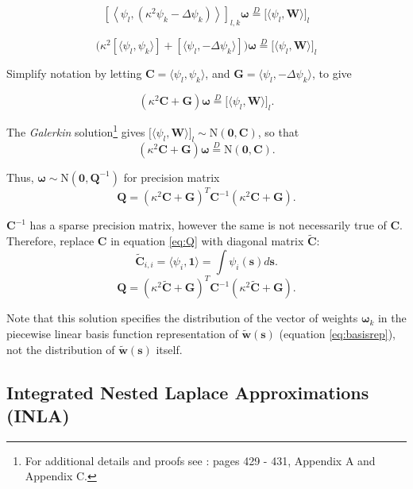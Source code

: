 $$  \left[ \left< \psi_{l}, (\kappa^{2}\psi_{k} - \Delta \psi_{k})  \right> \right]_{l,k} \pmb{\omega} 
\overset{D}{=} 
\Big[ \langle \psi_{l}, \pmb{W} \rangle \Big]_{l}  $$

$$ \Big( \kappa^{2} [ \langle \psi_{l}, \psi_{k} \rangle ] + [ \langle \psi_{l}, -\Delta \psi_{k} \rangle ] \Big) \pmb{\omega} 
\overset{D}{=} 
\Big[ \langle \psi_{l}, \pmb{W} \rangle \Big]_{l} $$

Simplify notation by letting $\pmb{C} = \langle \psi_{l}, \psi_{k} \rangle$, and $ \pmb{G} = \langle \psi_{l}, - \Delta \psi_{k} \rangle$, to give

$$ \left(
\kappa^{2} \pmb{C} + \pmb{G} \right) \pmb{\omega} \overset{D}{=} \Big[ \langle \psi_{l}, \pmb{W} \rangle \Big]_{l}.$$

The {\it Galerkin} solution\footnote{For additional details and proofs see \cite{Lindgren2011}: pages 429 - 431, Appendix A and Appendix C.} gives $\Big[ \langle \psi_{l}, \pmb{W} \rangle \Big]_{l} \sim \text{N}(\pmb{0},\pmb{C})$, so that
$$ \left(
\kappa^{2} \pmb{C} + \pmb{G} \right) \pmb{\omega} \overset{D}{=} \text{N}(\pmb{0},\pmb{C}).$$

Thus, $\pmb{\omega} \sim \text{N}(\pmb{0}, \pmb{Q}^{-1})$ for precision matrix
\begin{equation} \label{eq:Q}
\pmb{Q} = \left( \kappa^{2} \pmb{C} + \pmb{G} \right)^{T} \pmb{C}^{-1} \left( \kappa^{2} \pmb{C} + \pmb{G} \right).
\end{equation}

$\pmb{C}^{-1}$ has a sparse precision matrix, however the same is not necessarily true of $\pmb{C}$. Therefore, replace $\pmb{C}$ in equation \ref{eq:Q} with diagonal matrix $\widetilde{\pmb{C}}$:
$$ \widetilde{\pmb{C}}_{i,i} = \langle \psi_{i}, \pmb{1} \rangle = \int \psi_{i}(\pmb{s}) d\pmb{s}.$$
\begin{equation} \label{eq:Q2}
\pmb{Q} = \left( \kappa^{2} \widetilde{\pmb{C}} + \pmb{G} \right)^{T} \pmb{C}^{-1} \left( \kappa^{2} \widetilde{\pmb{C}} + \pmb{G} \right).
\end{equation}

Note that this solution specifies the distribution of the vector of weights $\pmb{\omega}_{k}$ in the piecewise linear basis function representation of $\widetilde{\pmb{w}}(\pmb{s})$ (equation \ref{eq:basisrep}), not the distribution of $\widetilde{\pmb{w}}(\pmb{s})$ itself.

\subsection{Integrated Nested Laplace Approximations (INLA)}

